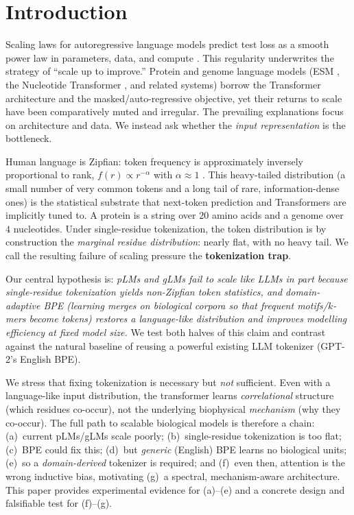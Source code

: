 \documentclass[11pt]{article}
\begin{document}
\section{Introduction}
Scaling laws for autoregressive language models predict test loss as a smooth
power law in parameters, data, and compute \citep{kaplan2020}. This regularity
underwrites the strategy of ``scale up to improve.'' Protein and genome language
models (ESM \citep{rives2021,lin2023}, the Nucleotide Transformer
\citep{dallatorre2023}, and related systems) borrow the Transformer
architecture and the masked/auto-regressive objective, yet their returns to
scale have been comparatively muted and irregular. The prevailing explanations
focus on architecture and data. We instead ask whether the \emph{input
representation} is the bottleneck.

Human language is Zipfian: token frequency is approximately inversely
proportional to rank, $f(r)\propto r^{-\alpha}$ with $\alpha\approx 1$
\citep{zipf1949}. This heavy-tailed distribution (a small number of very common
tokens and a long tail of rare, information-dense ones) is the statistical
substrate that next-token prediction and Transformers are implicitly tuned to.
A protein is a string over $20$ amino acids and a genome over $4$ nucleotides.
Under single-residue tokenization, the token distribution is by construction the
\emph{marginal residue distribution}: nearly flat, with no heavy tail. We call
the resulting failure of scaling pressure the \textbf{tokenization trap}.

Our central hypothesis is: \emph{pLMs and gLMs fail to scale like LLMs in part
because single-residue tokenization yields non-Zipfian token statistics, and
domain-adaptive BPE (learning merges on biological corpora so that frequent
motifs/$k$-mers become tokens) restores a language-like distribution and
improves modelling efficiency at fixed model size.} We test both halves of this
claim and contrast against the natural baseline of reusing a powerful existing
LLM tokenizer (GPT-2's English BPE).

We stress that fixing tokenization is necessary but \emph{not} sufficient. Even
with a language-like input distribution, the transformer learns
\emph{correlational} structure (which residues co-occur), not the underlying
biophysical \emph{mechanism} (why they co-occur). The full path to scalable
biological models is therefore a chain: (a)~current pLMs/gLMs scale poorly;
(b)~single-residue tokenization is too flat; (c)~BPE could fix this; (d)~but
\emph{generic} (English) BPE learns no biological units; (e)~so a
\emph{domain-derived} tokenizer is required; and (f)~even then, attention is the
wrong inductive bias, motivating (g)~a spectral, mechanism-aware architecture.
This paper provides experimental evidence for (a)--(e) and a concrete design and
falsifiable test for (f)--(g).
\end{document}
